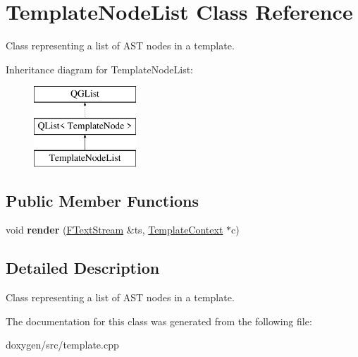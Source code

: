 \hypertarget{class_template_node_list}{}\section{Template\+Node\+List Class Reference}
\label{class_template_node_list}


Class representing a list of A\+ST nodes in a template.  


Inheritance diagram for Template\+Node\+List\+:\begin{figure}[H]
\begin{center}
\leavevmode
\includegraphics[height=3.000000cm]{class_template_node_list}
\end{center}
\end{figure}
\subsection*{Public Member Functions}
\begin{DoxyCompactItemize}
\item 
\mbox{\label{class_template_node_list_a40a5cf2c5ff861d19bc0d1b0b8baa40e}} 
void {\bfseries render} (\mbox{\hyperlink{class_f_text_stream}{F\+Text\+Stream}} \&ts, \mbox{\hyperlink{class_template_context}{Template\+Context}} $\ast$c)
\end{DoxyCompactItemize}


\subsection{Detailed Description}
Class representing a list of A\+ST nodes in a template. 

The documentation for this class was generated from the following file\+:\begin{DoxyCompactItemize}
\item 
doxygen/src/template.\+cpp\end{DoxyCompactItemize}
